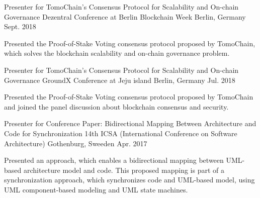 


\begin{cventries}


\cventry
{Presenter for TomoChain's Consensus Protocol for Scalability and On-chain Governance} %
{Dezentral Conference at Berlin Blockchain Week} %
{Berlin, Germany} %
{Sept. 2018} %
{ %
	\begin{cvitems}
		\item {Presented the Proof-of-Stake Voting consensus protocol proposed by TomoChain, which solves the blockchain scalability and on-chain governance problem.}
	\end{cvitems}
}

\cventry
{Presenter for TomoChain's Consensus Protocol for Scalability and On-chain Governance} %
{GroundX Conference at Jeju island} %
{Berlin, Germany} %
{Jul. 2018} %
{ %
	\begin{cvitems}
		\item {Presented the Proof-of-Stake Voting consensus protocol proposed by TomoChain and joined the panel discussion about blockchain consensus and security.}
	\end{cvitems}
}


\cventry
{Presenter for Conference Paper: Bidirectional Mapping Between Architecture and Code for Synchronization} %
{14th ICSA (International Conference on Software Architecture)} %
{Gothenburg, Sweeden} %
{Apr. 2017} %
{ %
\begin{cvitems}
\item {Presented an approach, which enables a bidirectional mapping between UML-based architecture model and code. This proposed mapping is part of a synchronization approach, which synchronizes code and UML-based model, using UML component-based modeling and UML state machines.}
\end{cvitems}
}


\end{cventries}
